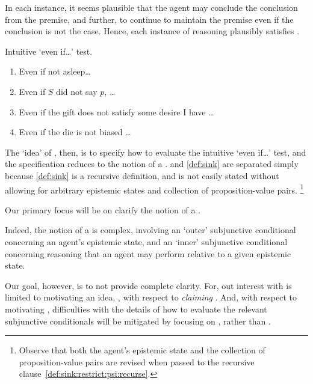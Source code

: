 \begin{note}
  In each instance, it seems plausible that the agent may conclude the conclusion from the premise, and further, to continue to maintain the premise even if the conclusion is not the case.
  Hence, each instance of reasoning plausibly satisfies \ideaS{}.

  \color{red}
  Intuitive `even if\dots' test.

  \begin{enumerate}[label=\ref{fig:ideaS:basic-examples}\alph*., ref=(\ref{fig:ideaS:basic-examples}\alph*)]
  \item Even if not asleep\dots
  \item Even if \(S\) did not say \(p\), \dots
  \item Even if the gift does not satisfy some desire I have \dots
  \item Even if the die is not biased \dots
  \end{enumerate}
\end{note}

\begin{note}
  The `idea' of \ideaS{}, then, is to specify how to evaluate the intuitive `even if\dots' test, and the specification reduces to the notion of a \sink{}.
  \ideaS{} and \autoref{def:sink} are separated simply because \autoref{def:sink} is a recursive definition, and is not easily stated without allowing for arbitrary epistemic states and collection of proposition-value pairs.\nolinebreak
  \footnote{
    Observe that both the agent's epistemic state and the collection of proposition-value pairs are revised when passed to the recursive clause~\ref{def:sink:restrict:psi:recurse}.
  }
\end{note}



\begin{note}
  Our primary focus will be on clarify the notion of a \sink{}.

  Indeed, the notion of a \sink{} is complex, involving an `outer' subjunctive conditional concerning an agent's epistemic state, and an `inner' subjunctive conditional concerning reasoning that an agent may perform relative to a given epistemic state.

  Our goal, however, is to not provide complete clarity.
  For, out interest with \support{} is limited to motivating an idea, \ideaCS{}, with respect to \emph{claiming} \support{}.
  And, with respect to motivating \ideaCS{}, difficulties with the details of how to evaluate the relevant subjunctive conditionals will be mitigated by focusing on , rather than .
\end{note}

